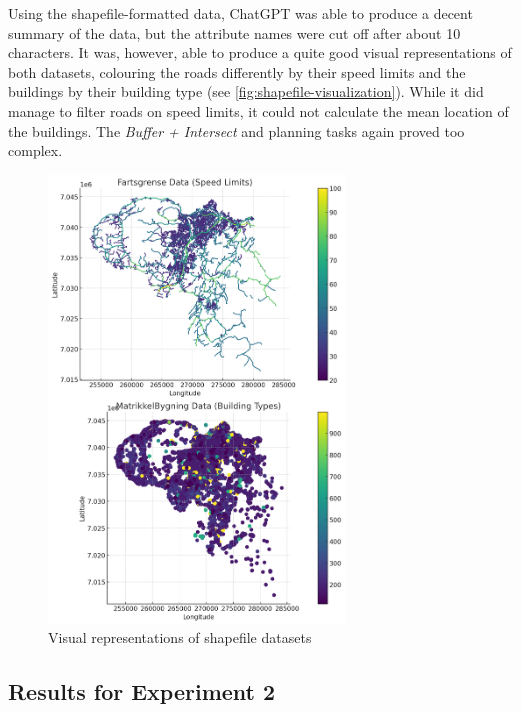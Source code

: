 Using the shapefile-formatted data, ChatGPT was able to produce a decent summary of the data, but the attribute names were cut off after about 10 characters. It was, however, able to produce a quite good visual representations of both datasets, colouring the roads differently by their speed limits and the buildings by their building type (see \autoref{fig:shapefile-visualization}). While it did manage to filter roads on speed limits, it could not calculate the mean location of the buildings. The \textit{Buffer + Intersect} and planning tasks again proved too complex.

\begin{figure}
    \centering
    \includegraphics[width=0.7\textwidth]{../figs/shape_plot.png}
    \caption{Visual representations of shapefile datasets}
    \label{fig:shapefile-visualization}
\end{figure}

\subsection{Results for Experiment 2}\label{subsec:experiment-2-results}

